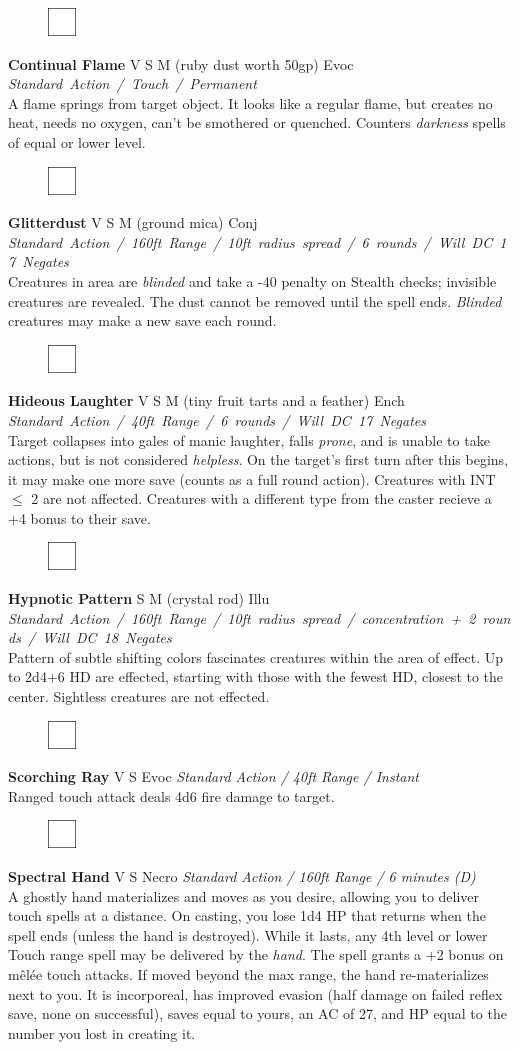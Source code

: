 \documentclass[letterpaper]{article}
\newcommand{\spell}[7]{
\begin{figure}
\vspace{-13pt}
\ifstrequal{#2}{Full}{  \includegraphics[width=2em]{Checkbox-Full}}{
\ifstrequal{#2}{Scroll}{\includegraphics[width=2em]{Checkbox-S}}{
                        \includegraphics[width=2em]{Checkbox}}}
\ifstrequal{#7}{}{\vspace{-1em}}{\vspace{#7}}
\end{figure}
\noindent \textbf{#1} #3 {
    \ifstrequal{#4}{Conj}{\color{Plum}Conj}{%
    \ifstrequal{#4}{Divin}{\color{YellowOrange}Divin}{%
    \ifstrequal{#4}{Ench}{\color{VioletRed}Ench}{%
    \ifstrequal{#4}{Trans}{\color{LimeGreen}Trans}{%
    \ifstrequal{#4}{Evoc}{\color{RedOrange}Evoc}{%
    \ifstrequal{#4}{Illu}{\color{ProcessBlue}Illu}{%
    \ifstrequal{#4}{Abjur}{\color{CadetBlue}Abjur}{%
    \ifstrequal{#4}{Necro}{\color{Red}Necro}{%
}}}}}}}}}
{\footnotesize \emph{#5}} \\
#6
}
\begin{document}
\spell{Continual Flame}{}{V S M (ruby dust worth 50gp)}{Evoc}{\mbox{Standard Action / Touch / Permanent}}{%
A flame springs from target object.  It looks like a regular flame, but creates no heat, needs no oxygen, can't be smothered or quenched.  Counters \emph{darkness} spells of equal or lower level.}{}

\spell{Glitterdust}{}{V S M (ground mica)}{Conj}{\mbox{Standard Action / 160ft Range / 10ft radius spread / 6 rounds / Will DC 17 Negates }}{%
Creatures in area are \emph{blinded} and take a -40 penalty on Stealth checks; invisible creatures are revealed. The dust cannot be removed until the spell ends. \emph{Blinded} creatures may make a new save each round.}{} %

\spell{Hideous Laughter}{}{V S M (tiny fruit tarts and a feather)}{Ench}{\mbox{Standard Action / 40ft Range / 6 rounds / Will DC 17 Negates }}{%
Target collapses into gales of manic laughter, falls \emph{prone}, and is unable to take actions, but is not considered \emph{helpless}. On the target's first turn after this begins, it may make one more save (counts as a full round action).  Creatures with INT $\leq$ 2 are not affected.  Creatures with a different type from the caster recieve a +4 bonus to their save.}{0em} %

\spell{Hypnotic Pattern}{}{S M (crystal rod)}{Illu}{\mbox{Standard Action / 160ft Range / 10ft radius spread / concentration + 2 rounds / Will DC 18 Negates }}{%
Pattern of subtle shifting colors fascinates creatures within the area of effect.  Up to 2d4+6 HD are effected, starting with those with the fewest HD, closest to the center.  Sightless creatures are not effected.}{} %

\spell{Scorching Ray}{}{V S}{Evoc}{Standard Action / 40ft Range / Instant}{%
Ranged touch attack deals 4d6 fire damage to target.}{}\\[-1em] %

\spell{Spectral Hand}{}{V S}{Necro}{\emph{Standard Action / 160ft Range / 6 minutes (D)}}{%
A ghostly hand materializes and moves as you desire, allowing you to deliver touch spells at a distance.  On casting, you lose 1d4 HP that returns when the spell ends (unless the hand is destroyed).  While it lasts, any 4th level or lower Touch range spell may be delivered by the \emph{hand}.  The spell grants a +2 bonus on m\^{e}l\'{e}e touch attacks. If moved beyond the max range, the hand re-materializes next to you.  It is incorporeal, has improved evasion (half damage on failed reflex save, none on successful), saves equal to yours, an AC of 27, and HP equal to the number you lost in creating it.}{2em}\\[-2em] %
\end{document}
